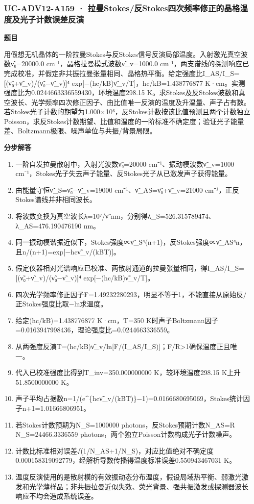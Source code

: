 \documentclass[UTF8,11pt,a4paper]{ctexart}
\begin{document}
\subsubsection*{UC-ADV12-A159 · 拉曼Stokes/反Stokes四次频率修正的晶格温度及光子计数误差反演}
\noindent\textbf{题目}\par
用假想无机晶体的一阶拉曼Stokes与反Stokes信号反演局部温度。入射激光真空波数ν̃₀=20000.0 cm⁻¹，晶格拉曼模式波数ν̃\_v=1000.0 cm⁻¹，两支谱线的探测响应已完成校准，并假定非共振拉曼张量相同、晶格热平衡。给定强度比I\_AS/I\_S=[(ν̃₀+ν̃\_v)/(ν̃₀−ν̃\_v)]⁴ exp[−(hc/kB)ν̃\_v/T]，hc/kB=1.438776877 K·cm。实测强度比为0.0244663336559430，环境温度298.15 K。求Stokes及反Stokes波数和真空波长、光学频率四次修正因子、由比值唯一反演的温度及升温量、声子占有数。若Stokes光子计数的期望为1.000×10⁶，反Stokes计数按该比值预测且两个计数独立Poisson，求反Stokes计数期望、比值和温度的一阶标准不确定度；验证光子能量差、Boltzmann极限、噪声单位与共振/背景局限。\par
\medskip\noindent\textbf{分步解答}
\begin{enumerate}
\item 一阶自发拉曼散射中，入射光波数ν̃₀=20000 cm⁻¹、振动模波数ν̃\_v=1000 cm⁻¹，Stokes光子失去声子能量、反Stokes光子从已激发声子获得能量。
\item 由能量守恒ν̃\_S=ν̃₀−ν̃\_v=19000 cm⁻¹、ν̃\_AS=ν̃₀+ν̃\_v=21000 cm⁻¹，正反Stokes谱线并非相同波长。
\item 将波数变换为真空波长λ=10⁷/ν̃ nm，分别得λ\_S=526.315789474、λ\_AS=476.190476190 nm。
\item 同一振动模谐振近似下，Stokes强度∝ν̃\_S⁴(n+1)，反Stokes强度∝ν̃\_AS⁴n，且n/(n+1)=exp[−hcν̃\_v/(kBT)]。
\item 假定仪器相对光谱响应已校准、两散射通道的拉曼张量相同，得I\_AS/I\_S=[(ν̃₀+ν̃\_v)/(ν̃₀−ν̃\_v)]⁴ exp[−(hc/kB)ν̃\_v/T]。
\item 四次光学频率修正因子F=1.49232280293，明显不等于1，不能直接从原始反/正Stokes强度比取−ln求温度。
\item 给定(hc/kB)=1.438776877 K·cm，T=350 K时声子Boltzmann因子=0.0163947998436，理论强度比=0.0244663336559。
\item 从两强度反演T=(hc/kB)ν̃\_v/ln[F/(I\_AS/I\_S)]；F/R>1确保温度正且唯一。
\item 代入已校准强度比得到T\_inv=350.000000000 K，较环境温度298.15 K上升51.8500000000 K。
\item 声子平均占据数n=1/(e\textasciicircum{}\{hcν̃\_v/(kBT)\}−1)=0.0166680695069，Stokes统计因子n+1=1.01666806951。
\item 若Stokes计数预期为N\_S=1000000 photons，反Stokes预期计数N\_AS=R N\_S=24466.3336559 photons，两个独立Poisson计数构成光子计数噪声。
\item 计数比标准相对误差√(1/N\_AS+1/N\_S)，对应比值绝对不确定度0.000158319092779，经解析导数传播得温度标准误差0.550943467031 K。
\item 温度反演使用的是散射模的有效振动态分布温度，假设局域热平衡、弱激光激发和光学薄样品；非共振拉曼近似失效、荧光背景、强共振激发或探测器波长响应不均会造成系统误差。
\end{enumerate}
\end{document}
